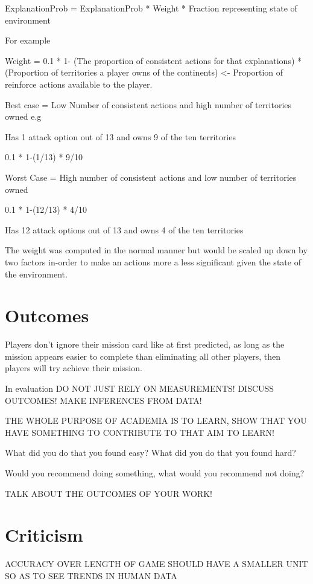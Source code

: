 \documentclass[parskip]{cs4rep}
\begin{document}
ExplanationProb = ExplanationProb * Weight * Fraction representing state of environment

For example

Weight = 0.1 * 1- (The proportion of consistent actions for that explanations) * (Proportion of territories a player owns of the continents) <- Proportion of reinforce actions available to the player.

Best case = Low Number of consistent actions and high number of territories owned e.g

Has 1 attack option out of 13 and owns 9 of the ten territories

0.1 * 1-(1/13) * 9/10 

Worst Case = High number of consistent actions and low number of territories owned

0.1 * 1-(12/13) * 4/10 

Has 12 attack options out of 13 and owns 4 of the ten territories

The weight was computed in the normal manner but would be scaled up down by two factors in-order to make an actions more a less significant given the state of the environment.

\section{Outcomes}

Players don't ignore their mission card like at first predicted, as long as the mission appears easier to complete than eliminating all other players, then players will try achieve their mission.

In evaluation DO NOT JUST RELY ON MEASUREMENTS! DISCUSS OUTCOMES! MAKE INFERENCES FROM DATA!

THE WHOLE PURPOSE OF ACADEMIA IS TO LEARN, SHOW THAT YOU HAVE SOMETHING TO CONTRIBUTE TO THAT AIM TO LEARN!

What did you do that you found easy? What did you do that you found hard? 

Would you recommend doing something, what would you recommend not doing?

TALK ABOUT THE OUTCOMES OF YOUR WORK!

\section{Criticism}

ACCURACY OVER LENGTH OF GAME SHOULD HAVE A SMALLER UNIT SO AS TO SEE TRENDS IN HUMAN DATA
\end{document}
